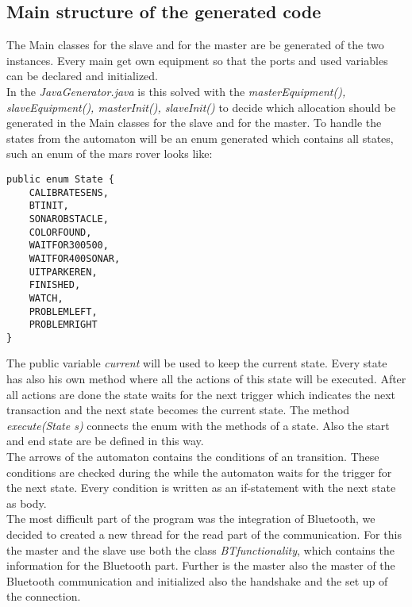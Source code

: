 \documentclass[11pt,a4paper]{article}
\begin{document}
\subsection*{Main structure of the generated code}
The Main classes for the slave and for the master are be generated of the two instances. Every main get  own equipment so that the ports and used variables can be declared and initialized. \\
In the \emph{JavaGenerator.java} is this solved with the \emph{masterEquipment(), slaveEquipment(), masterInit(), slaveInit()} to decide which allocation should be generated in the Main classes for the slave and for the master. To handle the states from the automaton will be an enum generated which contains all states, such an enum of the mars rover looks like: 
\begin{verbatim}
public enum State {
    CALIBRATESENS,
    BTINIT,
    SONAROBSTACLE,
    COLORFOUND,
    WAITFOR300500,
    WAITFOR400SONAR,
    UITPARKEREN,
    FINISHED,
    WATCH,
    PROBLEMLEFT,
    PROBLEMRIGHT
}
\end{verbatim}

The public variable \emph{current} will be used to keep the current state. Every state has also his own method where all the actions of this state will be executed. After all actions are done the state waits for the next trigger which indicates the next transaction and the next state becomes the current state. 
The method \emph{execute(State s)} connects the enum with the methods of a state. Also the start and end state are be defined in this way. \\
The arrows of the automaton contains the conditions of an transition. These conditions are checked during the while the automaton waits for the trigger for the next state. Every condition is written as an if-statement with the next state as body. \\

The most difficult part of the program was the integration of Bluetooth, we decided to created a new thread for the read part of the communication. For this the master and the slave use both the class \emph{BTfunctionality}, which contains the information for the Bluetooth part. Further is the master also the master of the Bluetooth communication and initialized also the handshake and the set up of the connection. \\
\end{document}
